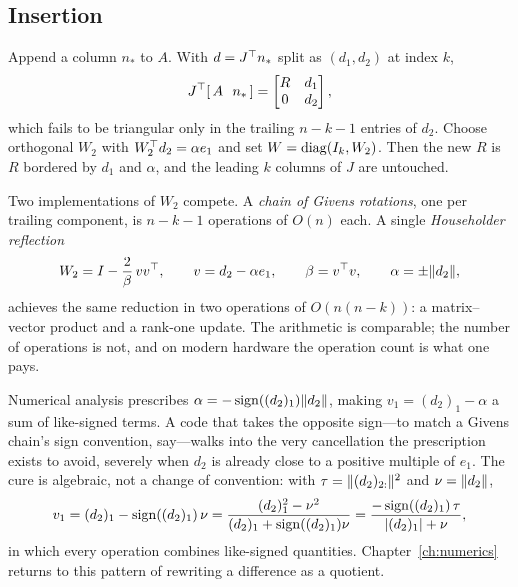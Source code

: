 \subsection{Insertion}

Append a column $n_*$ to $A$. With $d = J^{\top} n_*$ split as $(d_1,d_2)$ at index $k$,
\[
  J^{\top} [\,A \ \ n_*\,] = \begin{bmatrix} R & d_1 \\ 0 & d_2 \end{bmatrix},
\]
which fails to be triangular only in the trailing $n-k-1$ entries of $d_2$. Choose
orthogonal $W_2$ with $W_2^{\top} d_2 = \alpha e_1$ and set $W = \operatorname{diag}(I_k, W_2)$. Then
the new $R$ is $R$ bordered by $d_1$ and $\alpha$, and the leading $k$ columns of
$J$ are untouched.

Two implementations of $W_2$ compete. A \emph{chain of Givens rotations}, one per
trailing component, is $n-k-1$ operations of $O(n)$ each. A single
\emph{Householder reflection}
\begin{equation}
  W_2 = I - \frac{2}{\beta}\, v v^{\top},
  \qquad v = d_2 - \alpha e_1,
  \qquad \beta = v^{\top} v,
  \qquad \alpha = \pm\lVert d_2 \rVert,
  \label{eq:householder}
\end{equation}
achieves the same reduction in two operations of $O(n(n-k))$: a matrix--vector
product and a rank-one update. The arithmetic is comparable; the number of
operations is not, and on modern hardware the operation count is what one pays.

\begin{remark}
\label{rem:sign}
Numerical analysis prescribes $\alpha = -\operatorname{sign}((d_2)_1)\lVert d_2 \rVert$, making
$v_1 = (d_2)_1 - \alpha$ a sum of like-signed terms. A code that takes the opposite
sign---to match a Givens chain's sign convention, say---walks into the very
cancellation the prescription exists to avoid, severely when $d_2$ is already close
to a positive multiple of $e_1$. The cure is algebraic, not a change of convention:
with $\tau = \lVert (d_2)_{2:} \rVert^2$ and $\nu = \lVert d_2 \rVert$,
\begin{equation}
  v_1 = (d_2)_1 - \operatorname{sign}((d_2)_1)\,\nu
      = \frac{(d_2)_1^2 - \nu^2}{(d_2)_1 + \operatorname{sign}((d_2)_1)\nu}
      = \frac{-\operatorname{sign}((d_2)_1)\,\tau}{|(d_2)_1| + \nu},
  \label{eq:nocancel}
\end{equation}
in which every operation combines like-signed quantities. Chapter~\ref{ch:numerics}
returns to this pattern of rewriting a difference as a quotient.
\end{remark}

